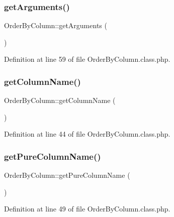 \subsubsection{\texorpdfstring{get\+Arguments()}{getArguments()}}
{\footnotesize\ttfamily Order\+By\+Column\+::get\+Arguments (\begin{DoxyParamCaption}{ }\end{DoxyParamCaption})}



Definition at line 59 of file Order\+By\+Column.\+class.\+php.

\mbox{\label{classOrderByColumn_aa6e094dc084a79fa96a6cc529ac4431f}} 
\subsubsection{\texorpdfstring{get\+Column\+Name()}{getColumnName()}}
{\footnotesize\ttfamily Order\+By\+Column\+::get\+Column\+Name (\begin{DoxyParamCaption}{ }\end{DoxyParamCaption})}



Definition at line 44 of file Order\+By\+Column.\+class.\+php.

\mbox{\label{classOrderByColumn_a11d8fa0bb15e4089d6cedde469f51aa7}} 
\subsubsection{\texorpdfstring{get\+Pure\+Column\+Name()}{getPureColumnName()}}
{\footnotesize\ttfamily Order\+By\+Column\+::get\+Pure\+Column\+Name (\begin{DoxyParamCaption}{ }\end{DoxyParamCaption})}



Definition at line 49 of file Order\+By\+Column.\+class.\+php.

\mbox{\label{classOrderByColumn_a7279ca2da1f1376de633eef931ff86ff}} 
